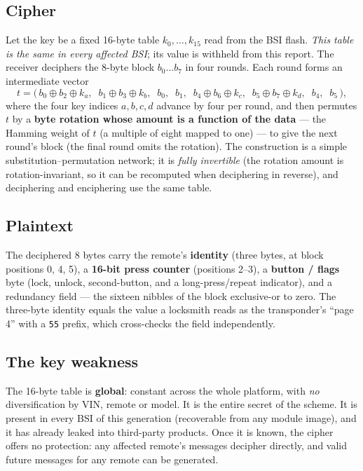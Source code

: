 \documentclass[11pt,a4paper]{article}
\newcommand{\hex}[1]{\texttt{#1}}
\begin{document}
\subsection{Cipher}
Let the key be a fixed 16-byte table $k_0,\dots,k_{15}$ read from the BSI flash. \emph{This table is the same in every affected BSI}; its value is withheld from this report. The receiver deciphers the 8-byte block $b_0\dots b_7$ in four rounds. Each round forms an intermediate vector
\[
t = \big(\,b_0\!\oplus\!b_2\!\oplus\!k_{a},\;\; b_1\!\oplus\!b_3\!\oplus\!k_{b},\;\; b_0,\;\; b_1,\;\; b_4\!\oplus\!b_6\!\oplus\!k_{c},\;\; b_5\!\oplus\!b_7\!\oplus\!k_{d},\;\; b_4,\;\; b_5\,\big),
\]
where the four key indices $a,b,c,d$ advance by four per round, and then permutes $t$ by a \textbf{byte rotation whose amount is a function of the data} --- the Hamming weight of $t$ (a multiple of eight mapped to one) --- to give the next round's block (the final round omits the rotation). The construction is a simple substitution--permutation network; it is \emph{fully invertible} (the rotation amount is rotation-invariant, so it can be recomputed when deciphering in reverse), and deciphering and enciphering use the same table.

\subsection{Plaintext}
The deciphered 8 bytes carry the remote's \textbf{identity} (three bytes, at block positions 0, 4, 5), a \textbf{16-bit press counter} (positions 2--3), a \textbf{button / flags} byte (lock, unlock, second-button, and a long-press/repeat indicator), and a redundancy field --- the sixteen nibbles of the block exclusive-or to zero. The three-byte identity equals the value a locksmith reads as the transponder's ``page 4'' with a \hex{55} prefix, which cross-checks the field independently.

\subsection{The key weakness}
The 16-byte table is \textbf{global}: constant across the whole platform, with \emph{no} diversification by VIN, remote or model. It is the entire secret of the scheme. It is present in every BSI of this generation (recoverable from any module image), and it has already leaked into third-party products. Once it is known, the cipher offers no protection: any affected remote's messages decipher directly, and valid future messages for any remote can be generated.
\end{document}
